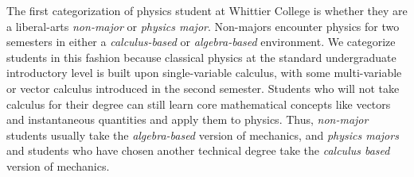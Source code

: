 \documentclass[../../main.tex]{subfiles}
\begin{document}
The first categorization of physics student at Whittier College is whether they are a liberal-arts \textit{non-major} or \textit{physics major}.  Non-majors encounter physics for two semesters in either a \textit{calculus-based} or \textit{algebra-based} environment.  We categorize students in this fashion because classical physics at the standard undergraduate introductory level is built upon single-variable calculus, with some multi-variable or vector calculus introduced in the second semester.  Students who will not take calculus for their degree can still learn core mathematical concepts like vectors and instantaneous quantities and apply them to physics.  Thus, \textit{non-major} students usually take the \textit{algebra-based} version of mechanics, and \textit{physics majors} and students who have chosen another technical degree take the \textit{calculus based} version of mechanics.  \\ \hspace{0.1cm}
\end{document}
